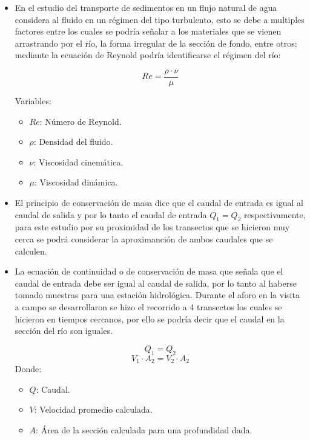 \documentclass[12pt,a4paper]{report}
\begin{document}
\begin{itemize}
\item En el estudio del transporte de sedimentos en un flujo natural de agua considera al fluido en un régimen del tipo turbulento, esto se debe a multiples factores entre los cuales se podría señalar a los materiales que se vienen arrastrando por el río, la forma irregular de la sección de fondo, entre otros; mediante la ecuación de Reynold podría identificarse el régimen del río:

\begin{equation*}
Re = \frac{\rho\cdot \nu }{\mu }
\end{equation*}

Variables:\\
\begin{itemize}
\item $Re$: Número de Reynold.
\item $\rho$: Densidad del fluido.
\item $\nu$: Viscosidad cinemática.
\item $\mu$: Viscosidad dinámica.
\end{itemize}


\item El principio de conservación de masa dice que el caudal de entrada es igual al caudal de salida y por lo tanto el caudal de entrada $Q_1=Q_2$ respectivamente, para este estudio por su proximidad de los transectos que se hicieron muy cerca se podrá considerar la aproximanción de ambos caudales que se calculen.

\item La ecuación de continuidad o de conservación de masa que señala que el caudal de entrada debe ser igual al caudal de salida, por lo tanto al haberse tomado muestras para una estación hidrológica. Durante el aforo en la visita a campo se desarrollaron se hizo el recorrido a 4 transectos los cuales se hicieron en tiempos cercanos, por ello se podría decir que el caudal en la sección del río son iguales.

$$Q_1 = Q_2$$
$$V_1\cdot A_2 =V_2\cdot A_2$$
Donde:
\begin{itemize}
\item $Q$: Caudal.
\item $V$: Velocidad promedio calculada.
\item $A$: Área de la sección calculada para una profundidad dada.
\end{itemize}



\end{itemize}
\end{document}

